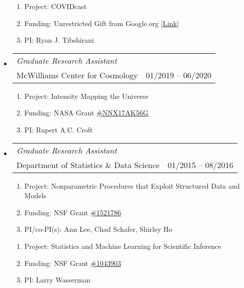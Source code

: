 \documentclass[letterpaper,10pt]{extarticle}
\makeatletter
\newcommand{\subheadingtwolines}[4]{
\begin{tabular*}{6.55in}{l@{\cftdotfill{\cftsecdotsep}\extracolsep{\fill}}r}
#1 & #2 \\
#3 & #4 \\
\end{tabular*}}
\makeatother
\begin{document}
\begin{itemize}[leftmargin=0.4cm, itemsep=0.5cm]
\begin{enumerate}[leftmargin=0.3cm, itemsep=-0.05ex]
	\item[] Project: COVIDcast
	\item[] Funding: Unrestricted Gift from Google.org [\href{https://www.cmu.edu/dietrich/news/news-stories/2020/september/delphi-google.html}{Link}]
	\item[] PI: Ryan J. Tibshirani
\end{enumerate}

\item[] \hspace{-2ex}\subheadingtwolines{{\it Graduate Research Assistant}}{}{McWilliams Center for Cosmology}{01/2019 -- 06/2020}

\begin{enumerate}[leftmargin=0.3cm, itemsep=-0.05ex]
	\item[] Project: Intensity Mapping the Universe
	\item[] Funding: NASA Grant \href{http://adsabs.harvard.edu/abs/2016atp..prop...26C}{\#NNX17AK56G}
	\item[] PI: Rupert A.C. Croft
\end{enumerate}


\item[] \hspace{-2ex}\subheadingtwolines{{\it Graduate Research Assistant}}{}{Department of Statistics \& Data Science}{01/2015 -- 08/2016}

\begin{enumerate}[leftmargin=0.3cm, itemsep=-0.05ex]
	\item[] Project: Nonparametric Procedures that Exploit Structured Data and Models 
	\item[] Funding: NSF Grant \href{https://www.nsf.gov/awardsearch/showAward?AWD_ID=1521786}{\#1521786}
	\item[] PI/co-PI(s): Ann Lee, Chad Schafer, Shirley Ho
\end{enumerate}

\begin{enumerate}[leftmargin=0.3cm, itemsep=-0.05ex]
	\item[] Project: Statistics and Machine Learning for Scientific Inference
	\item[] Funding: NSF Grant \href{https://www.nsf.gov/awardsearch/showAward?AWD_ID=1043903&HistoricalAwards=false}{\#1043903}
	\item[] PI: Larry Wasserman
\end{enumerate}


\end{itemize}
\end{document}
